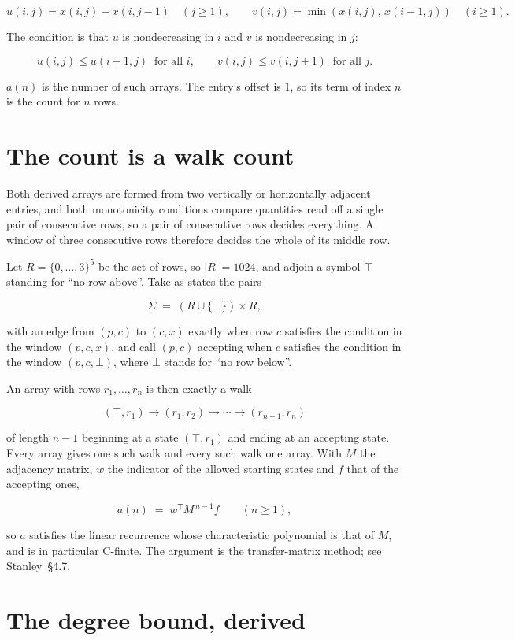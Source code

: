 \documentclass[11pt]{article}
\theoremstyle{definition}
\begin{document}
\[u(i,j) = x(i,j) - x(i,j{-}1)\quad (j \ge 1), \qquad v(i,j) = \min(x(i,j),\,x(i{-}1,j))\quad (i \ge 1).\]

The condition is that $u$ is nondecreasing in $i$ and $v$ is nondecreasing in $j$:

\[u(i,j) \le u(i{+}1,j) \ \text{ for all } i, \qquad v(i,j) \le v(i,j{+}1) \ \text{ for all } j.\]

$a(n)$ is the number of such arrays. The entry's offset is 1, so its term of index $n$ is the count for $n$ rows.

\section{The count is a walk count}

Both derived arrays are formed from two vertically or horizontally adjacent entries, and both monotonicity conditions compare quantities read off a single pair of consecutive rows, so a pair of consecutive rows decides everything. A window of three consecutive rows therefore decides the whole of its middle row.

Let $R = \{0,\dots,3\}^{5}$ be the set of rows, so $|R| = 1024$, and adjoin a symbol $\top$ standing for ``no row above''. Take as states the pairs

\[\Sigma \;=\; (R \cup \{\top\}) \times R,\]

with an edge from $(p,c)$ to $(c,x)$ exactly when row $c$ satisfies the condition in the window $(p,c,x)$, and call $(p,c)$ accepting when $c$ satisfies the condition in the window $(p,c,\bot)$, where $\bot$ stands for ``no row below''.

An array with rows $r_1,\dots,r_n$ is then exactly a walk

\[(\top,r_1) \to (r_1,r_2) \to \cdots \to (r_{n-1},r_n)\]

of length $n-1$ beginning at a state $(\top,r_1)$ and ending at an accepting state. Every array gives one such walk and every such walk one array. With $M$ the adjacency matrix, $w$ the indicator of the allowed starting states and $f$ that of the accepting ones,

\[a(n) \;=\; w^{\mathsf T} M^{\,n-1} f \qquad (n \ge 1),\]

so $a$ satisfies the linear recurrence whose characteristic polynomial is that of $M$, and is in particular C-finite. The argument is the transfer-matrix method; see Stanley~\S4.7.

\section{The degree bound, derived}
\end{document}
